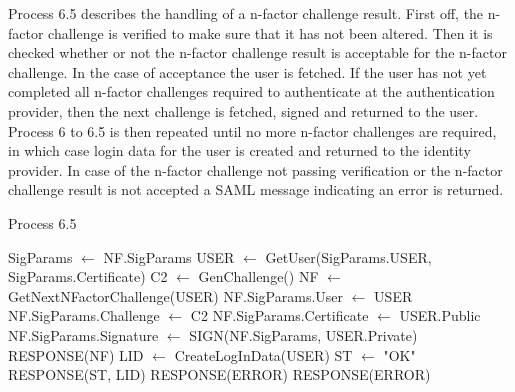 \documentclass[twosided]{report}
\begin{document}
Process 6.5 describes the handling of a n-factor challenge result. First off, the n-factor challenge is verified to make sure that it has not been altered. Then it is checked whether or not the n-factor challenge result is acceptable for the n-factor challenge. In the case of acceptance the user is fetched. If the user has not yet completed all n-factor challenges required to authenticate at the authentication provider, then the next challenge is fetched, signed and returned to the user. Process 6 to 6.5 is then repeated until no more n-factor challenges are required, in which case login data for the user is created and returned to the identity provider. In case of the n-factor challenge not passing verification or the n-factor challenge result is not accepted a SAML message indicating an error is returned.
\begin{algorithm}[H]
	\caption{Process 6.5}
	\begin{algorithmic}
		\STATE SigParams $\leftarrow$ NF.SigParams
				\STATE USER $\leftarrow$ GetUser(SigParams.USER, SigParams.Certificate)
				\STATE C2 $\leftarrow$ GenChallenge()
					\STATE NF $\leftarrow$ GetNextNFactorChallenge(USER)
					\STATE NF.SigParams.User $\leftarrow$ USER
					\STATE NF.SigParams.Challenge $\leftarrow$ C2
					\STATE NF.SigParams.Certificate $\leftarrow$ USER.Public
					\STATE NF.SigParams.Signature $\leftarrow$ SIGN(NF.SigParams, USER.Private)
					\RETURN RESPONSE(NF)
				\ELSE
					\STATE LID $\leftarrow$ CreateLogInData(USER)
					\STATE ST $\leftarrow$ "OK"
					\RETURN RESPONSE(ST, LID)
				\ENDIF
			\ELSE
				\RETURN RESPONSE(ERROR)
			\ENDIF
		\ELSE
			\RETURN RESPONSE(ERROR)
		\ENDIF	
	\end{algorithmic}
\end{algorithm}
\end{document}
